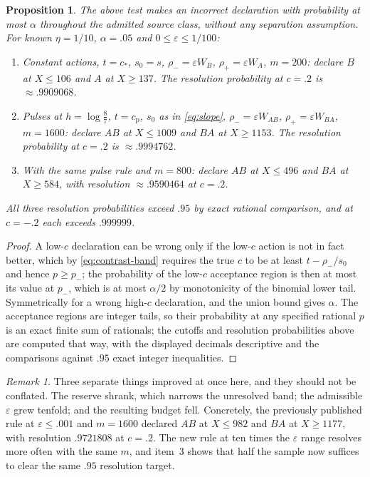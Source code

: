 \documentclass[11pt]{article}
\theoremstyle{plain}
\newtheorem{proposition}[theorem]{Proposition}
\theoremstyle{definition}
\theoremstyle{remark}
\newtheorem{remark}[theorem]{Remark}
\newcommand{\eps}{\varepsilon}
\newcommand{\cp}{c_{\mathrm p}}
\begin{document}
\begin{proposition}\label{prop:abstain}
The above test makes an incorrect declaration with probability at most $\alpha$
throughout the admitted source class, without any separation assumption. For
known $\eta=1/10$, $\alpha=.05$ and $0\le\eps\le1/100$:
\begin{enumerate}[nosep,leftmargin=*]
\item \emph{Constant actions}, $t=c_*$, $s_0=s$, $\rho_-=\eps W_B$,
      $\rho_+=\eps W_A$, $m=200$: declare $B$ at $X\le106$ and $A$ at
      $X\ge137$. The resolution probability at $c=.2$ is $\approx.9909068$.
\item \emph{Pulses} at $h=\log\frac87$, $t=\cp$, $s_0$ as in \eqref{eq:slope},
      $\rho_-=\eps W_{AB}$, $\rho_+=\eps W_{BA}$, $m=1600$: declare $AB$ at
      $X\le1009$ and $BA$ at $X\ge1153$. The resolution probability at $c=.2$ is
      $\approx.9994762$.
\item With the same pulse rule and $m=800$: declare $AB$ at $X\le496$ and $BA$
      at $X\ge584$, with resolution $\approx.9590464$ at $c=.2$.
\end{enumerate}
All three resolution probabilities exceed $.95$ by exact rational comparison,
and at $c=-.2$ each exceeds $.999999$.
\end{proposition}

\begin{proof}
A low-$c$ declaration can be wrong only if the low-$c$ action is not in fact
better, which by \eqref{eq:contrast-band} requires the true $c$ to be at least
$t-\rho_-/s_0$ and hence $p\ge p_-$; the probability of the low-$c$ acceptance
region is then at most its value at $p_-$, which is at most $\alpha/2$ by
monotonicity of the binomial lower tail. Symmetrically for a wrong high-$c$
declaration, and the union bound gives $\alpha$. The acceptance regions are
integer tails, so their probability at any specified rational $p$ is an exact
finite sum of rationals; the cutoffs and resolution probabilities above are
computed that way, with the displayed decimals descriptive and the comparisons
against $.95$ exact integer inequalities.
\end{proof}

\begin{remark}
Three separate things improved at once here, and they should not be conflated.
The reserve shrank, which narrows the unresolved band; the admissible $\eps$
grew tenfold; and the resulting budget fell. Concretely, the previously
published rule at $\eps\le.001$ and $m=1600$ declared $AB$ at $X\le982$ and
$BA$ at $X\ge1177$, with resolution $.9721808$ at $c=.2$. The new rule at ten
times the $\eps$ range resolves more often with the same $m$, and item~3 shows
that half the sample now suffices to clear the same $.95$ resolution target.
\end{remark}
\end{document}
